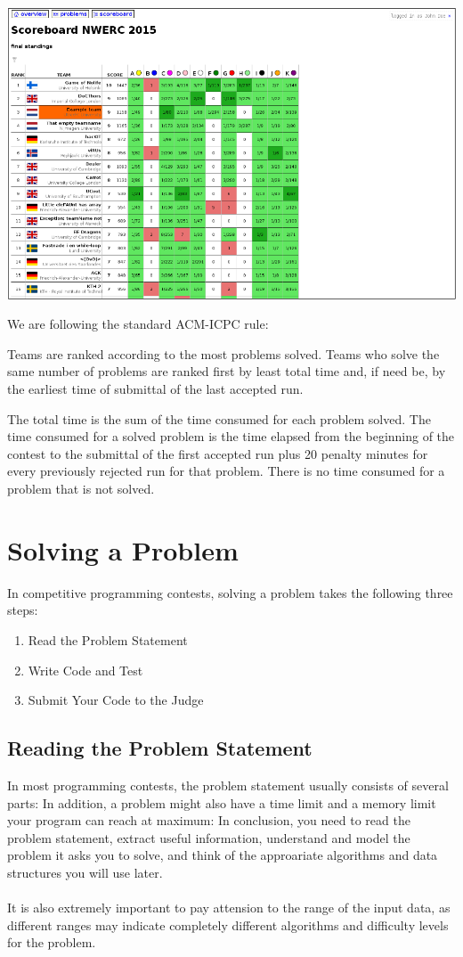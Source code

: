 \documentclass {article}
\begin{document}
\begin{center}
    \includegraphics[scale=0.3]{scoreboard.png}
\end{center}

We are following the standard ACM-ICPC rule:

Teams are ranked according to the most problems solved. 
Teams who solve the same number of problems are ranked first by least total 
time and, if need be, by the earliest time of submittal of the last accepted 
run.

The total time is the sum of the time consumed for each problem solved. 
The time consumed for a solved problem is the time elapsed from the beginning
of the contest to the submittal of the first accepted run plus 20 penalty 
minutes for every previously rejected run for that problem. 
There is no time consumed for a problem that is not solved.

\newpage
\section{Solving a Problem}
In competitive programming contests, solving a problem takes
the following three steps:
\begin{enumerate}
    \item Read the Problem Statement
    \item Write Code and Test
    \item Submit Your Code to the Judge
\end{enumerate}

\subsection{Reading the Problem Statement}
In most programming contests, the problem statement usually
consists of several parts:
\noindent In addition, a problem might also have a time limit and a memory limit
your program can reach at maximum:
\noindent In conclusion, you need to read the problem statement, 
extract useful information,
understand and model the problem it asks you to solve,
and think of the approariate algorithms and data structures 
you will use later.\\\\
It is also extremely important to pay attension to the range of the input
data, as different ranges may indicate completely different algorithms
and difficulty levels for the problem.
\end{document}
